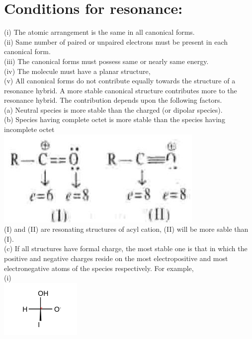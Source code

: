 \documentclass[10pt]{article}
\begin{document}
\section*{Conditions for resonance:}
(i) The atomic arrangement is the same in all canonical forms.\\
(ii) Same number of paired or unpaired electrons must be present in each canonical form.\\
(iii) The canonical forms must possess same or nearly same energy.\\
(iv) The molecule must have a planar structure,\\
(v) All canonical forms do not contribute equally towards the structure of a resonance hybrid. A more stable canonical structure contributes more to the resonance hybrid. The contribution depends upon the following factors.\\
(a) Neutral species is more stable than the charged (or dipolar species).\\
(b) Species having complete octet is more stable than the species having incomplete octet\\
\includegraphics[max width=\textwidth, center]{2025_01_28_8470952b98110cec3aabg-071(1)}\\
(I) and (II) are resonating structures of acyl cation, (II) will be more sable than (I).\\
(c) If all structures have formal charge, the most stable one is that in which the positive and negative charges reside on the most electropositive and most electronegative atoms of the species respectively. For example,\\
(i)\\
\includegraphics{smile-8581aedaf231101304415b52fcdfd2392648b860}\\
\end{document}

